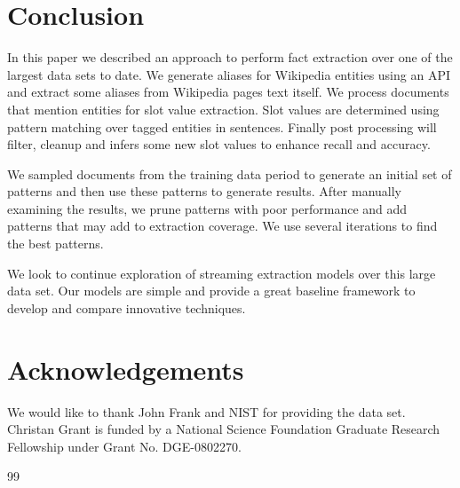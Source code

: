 \documentclass[letterpaper]{article}
\begin{document}
\section{Conclusion}

In this paper we described an approach to perform fact extraction over one of the largest data sets to date. 
We generate aliases for Wikipedia entities using an API and extract some aliases from Wikipedia pages text itself.
We process documents that mention entities for slot value extraction.
Slot values are determined using pattern matching over tagged entities in sentences.
Finally post processing will filter, cleanup and infers some new slot values to enhance recall and accuracy. 

We sampled documents from the training data period to generate an initial set of patterns and then use these patterns to generate results.
After manually examining the results, we prune patterns with poor performance and add patterns that may add to extraction coverage.
We use several iterations to find the best patterns.



We look to continue exploration of streaming extraction models over this large data set.
Our models are simple and provide a great baseline framework to develop and compare innovative techniques.







\section*{Acknowledgements}
We would like to thank John Frank and NIST for providing the data set.
Christan Grant is funded by a National Science Foundation Graduate Research Fellowship under Grant No. DGE-0802270.






{99}

\end{document}
